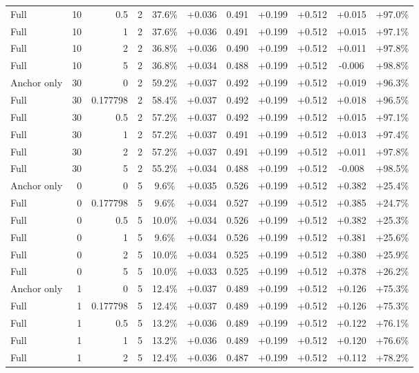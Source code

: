 \begin{table}[htbp]
\begin{tabular}{lrrrccccccc}
Full & 10 & 0.5 & 2 & 37.6\% & +0.036 & 0.491 & +0.199 & +0.512 & +0.015 & +97.0\% \\
Full & 10 & 1 & 2 & 37.6\% & +0.036 & 0.491 & +0.199 & +0.512 & +0.015 & +97.1\% \\
Full & 10 & 2 & 2 & 36.8\% & +0.036 & 0.490 & +0.199 & +0.512 & +0.011 & +97.8\% \\
Full & 10 & 5 & 2 & 36.8\% & +0.034 & 0.488 & +0.199 & +0.512 & -0.006 & +98.8\% \\
Anchor only & 30 & 0 & 2 & 59.2\% & +0.037 & 0.492 & +0.199 & +0.512 & +0.019 & +96.3\% \\
Full & 30 & 0.177798 & 2 & 58.4\% & +0.037 & 0.492 & +0.199 & +0.512 & +0.018 & +96.5\% \\
Full & 30 & 0.5 & 2 & 57.2\% & +0.037 & 0.492 & +0.199 & +0.512 & +0.015 & +97.1\% \\
Full & 30 & 1 & 2 & 57.2\% & +0.037 & 0.491 & +0.199 & +0.512 & +0.013 & +97.4\% \\
Full & 30 & 2 & 2 & 57.2\% & +0.037 & 0.491 & +0.199 & +0.512 & +0.011 & +97.8\% \\
Full & 30 & 5 & 2 & 55.2\% & +0.034 & 0.488 & +0.199 & +0.512 & -0.008 & +98.5\% \\
Anchor only & 0 & 0 & 5 & 9.6\% & +0.035 & 0.526 & +0.199 & +0.512 & +0.382 & +25.4\% \\
Full & 0 & 0.177798 & 5 & 9.6\% & +0.034 & 0.527 & +0.199 & +0.512 & +0.385 & +24.7\% \\
Full & 0 & 0.5 & 5 & 10.0\% & +0.034 & 0.526 & +0.199 & +0.512 & +0.382 & +25.3\% \\
Full & 0 & 1 & 5 & 9.6\% & +0.034 & 0.526 & +0.199 & +0.512 & +0.381 & +25.6\% \\
Full & 0 & 2 & 5 & 10.0\% & +0.034 & 0.525 & +0.199 & +0.512 & +0.380 & +25.9\% \\
Full & 0 & 5 & 5 & 10.0\% & +0.033 & 0.525 & +0.199 & +0.512 & +0.378 & +26.2\% \\
Anchor only & 1 & 0 & 5 & 12.4\% & +0.037 & 0.489 & +0.199 & +0.512 & +0.126 & +75.3\% \\
Full & 1 & 0.177798 & 5 & 12.4\% & +0.037 & 0.489 & +0.199 & +0.512 & +0.126 & +75.3\% \\
Full & 1 & 0.5 & 5 & 13.2\% & +0.036 & 0.489 & +0.199 & +0.512 & +0.122 & +76.1\% \\
Full & 1 & 1 & 5 & 13.2\% & +0.036 & 0.489 & +0.199 & +0.512 & +0.120 & +76.6\% \\
Full & 1 & 2 & 5 & 12.4\% & +0.036 & 0.487 & +0.199 & +0.512 & +0.112 & +78.2\% \\

\end{tabular}
\end{table}
